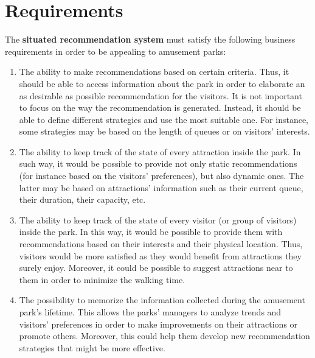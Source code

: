 \section{Requirements}\label{sec:requirements}

The \textbf{situated recommendation system} must satisfy the following business requirements in order to be appealing to amusement parks:
\begin{enumerate}
    \item The ability to make recommendations based on certain criteria.
    Thus, it should be able to access information about the park in order to elaborate an as desirable as possible recommendation for the visitors.
    It is not important to focus on the way the recommendation is generated.
    Instead, it should be able to define different strategies and use the most suitable one.
    For instance, some strategies may be based on the length of queues or on visitors' interests.
    \item The ability to keep track of the state of every attraction inside the park.
    In such way, it would be possible to provide not only static recommendations (for instance based on the visitors' preferences), but also dynamic ones.
    The latter may be based on attractions' information such as their current queue, their duration, their capacity, etc.
    \item The ability to keep track of the state of every visitor (or group of visitors) inside the park.
    In this way, it would be possible to provide them with recommendations based on their interests and their physical location.
    Thus, visitors would be more satisfied as they would benefit from attractions they surely enjoy.
    Moreover, it could be possible to suggest attractions near to them in order to minimize the walking time.
    \item The possibility to memorize the information collected during the amusement park's lifetime.
    This allows the parks' managers to analyze trends and visitors' preferences in order to make improvements on their attractions or promote others.
    Moreover, this could help them develop new recommendation strategies that might be more effective.
\end{enumerate}